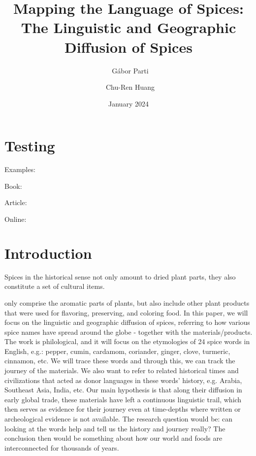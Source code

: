 \documentclass{dsh} %
\title{Mapping the Language of Spices: The Linguistic and Geographic Diffusion of Spices}
\author[1]{{\small\orcid{0000-0003-2042-4655}}~Gábor Parti}
\author[2]{{\small\orcid{0000-0002-8526-5520}}~Chu-Ren Huang}
\affil[1,2]{The Hong Kong Polytechnic University}
\date{\small{January 2024}}
\begin{document}
\maketitle

\begin{abstract}
\end{abstract}


\section{Testing}

Examples:

Book: \textcite{dalby_2000_dangerous}

Article: \textcite{dalby_2001_christopher}

Online: \textcite{oed}

\textcite{powo}




\section{Introduction}

Spices in the historical sense not only amount to dried plant parts, they also constitute a set of cultural items. 

only comprise the aromatic parts of plants, but also include other plant products that were used for flavoring, preserving, and coloring food. In this paper, we will focus on the linguistic and geographic diffusion of spices, referring to how various spice names have spread around the globe - together with the materials/products. The work is philological, and it will focus on the etymologies of 24 spice words in English, e.g.: pepper, cumin, cardamom, coriander, ginger, clove, turmeric, cinnamon, etc. We will trace these words and through this, we can track the journey of the materials. We also want to refer to related historical times and civilizations that acted as donor languages in these words' history, e.g. Arabia, Southeast Asia, India, etc. Our main hypothesis is that along their diffusion in early global trade, these materials have left a continuous linguistic trail, which then serves as evidence for their journey even at time-depths where written or archeological evidence is not available. The research question would be: can looking at the words help and tell us the history and journey really? The conclusion then would be something about how our world and foods are interconnected for thousands of years.
\end{document}
